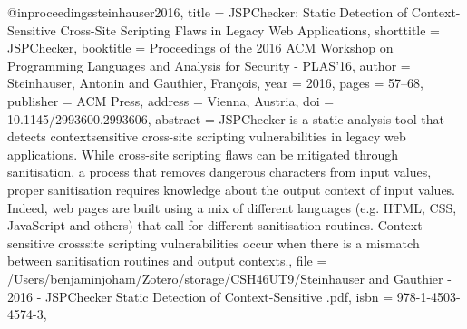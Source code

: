 @inproceedings{steinhauser2016,
  title = {{{JSPChecker}}: {{Static Detection}} of {{Context}}-{{Sensitive Cross}}-{{Site Scripting Flaws}} in {{Legacy Web Applications}}},
  shorttitle = {{{JSPChecker}}},
  booktitle = {Proceedings of the 2016 {{ACM Workshop}} on {{Programming Languages}} and {{Analysis}} for {{Security}} - {{PLAS}}'16},
  author = {Steinhauser, Antonin and Gauthier, Fran{\c c}ois},
  year = {2016},
  pages = {57--68},
  publisher = {{ACM Press}},
  address = {{Vienna, Austria}},
  doi = {10.1145/2993600.2993606},
  abstract = {JSPChecker is a static analysis tool that detects contextsensitive cross-site scripting vulnerabilities in legacy web applications. While cross-site scripting flaws can be mitigated through sanitisation, a process that removes dangerous characters from input values, proper sanitisation requires knowledge about the output context of input values. Indeed, web pages are built using a mix of different languages (e.g. HTML, CSS, JavaScript and others) that call for different sanitisation routines. Context-sensitive crosssite scripting vulnerabilities occur when there is a mismatch between sanitisation routines and output contexts.},
  file = {/Users/benjaminjoham/Zotero/storage/CSH46UT9/Steinhauser and Gauthier - 2016 - JSPChecker Static Detection of Context-Sensitive .pdf},
  isbn = {978-1-4503-4574-3},
}

